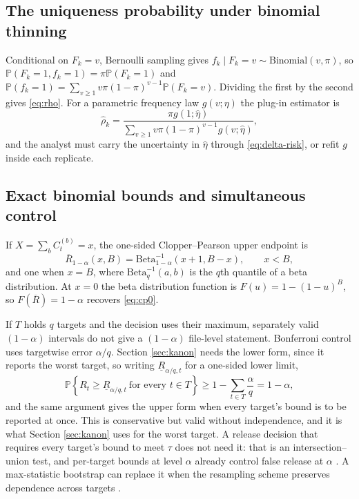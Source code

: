 \documentclass[11pt,a4paper]{article}
\theoremstyle{plain}
\theoremstyle{definition}
\theoremstyle{definition}
\theoremstyle{plain}
\newcommand{\Prob}{\mathbb{P}}
\begin{document}
\subsection{The uniqueness probability under binomial thinning}

Conditional on $F_k=v$, Bernoulli sampling gives $f_k\mid F_k=v\sim
\mathrm{Binomial}(v,\pi)$, so $\Prob(F_k=1,f_k=1)=\pi\Prob(F_k=1)$ and
$\Prob(f_k=1)=\sum_{v\ge1}v\pi(1-\pi)^{v-1}\Prob(F_k=v)$. Dividing the first by
the second gives \eqref{eq:rho}. For a parametric frequency law $g(v;\eta)$ the
plug-in estimator is
\begin{equation}
\widehat\rho_k=
\frac{\pi g(1;\widehat\eta)}
 {\sum_{v\ge1}v\pi(1-\pi)^{v-1}g(v;\widehat\eta)} ,
\end{equation}
and the analyst must carry the uncertainty in $\widehat\eta$ through
\eqref{eq:delta-risk}, or refit $g$ inside each replicate.

\subsection{Exact binomial bounds and simultaneous control}

If $X=\sum_b C_t^{(b)}=x$, the one-sided Clopper--Pearson upper endpoint is
\begin{equation}
\overline{R}_{1-\alpha}(x,B)=
\mathrm{Beta}^{-1}_{1-\alpha}(x+1,B-x),\qquad x<B,
\label{eq:cp-general}
\end{equation}
and one when $x=B$, where $\mathrm{Beta}^{-1}_q(a,b)$ is the $q$th quantile of a
beta distribution. At $x=0$ the beta distribution function is $F(u)=1-(1-u)^B$,
so $F(\overline{R})=1-\alpha$ recovers \eqref{eq:cp0}.

If $T$ holds $q$ targets and the decision uses their maximum, separately valid
$(1-\alpha)$ intervals do not give a $(1-\alpha)$ file-level statement. Bonferroni control uses targetwise error $\alpha/q$. Section \ref{sec:kanon} needs
the lower form, since it reports the worst target, so writing
$\underline{R}_{\alpha/q,t}$ for a one-sided lower limit,
\begin{equation}
\Prob\left\{R_t\ge \underline{R}_{\alpha/q,t}\ \text{for every }t\in T\right\}
\ge 1-\sum_{t\in T}\frac{\alpha}{q}=1-\alpha ,
\label{eq:bonf}
\end{equation}
and the same argument gives the upper form when every target's bound is to be
reported at once. This is conservative but valid without independence, and it is
what Section \ref{sec:kanon} uses for the worst target. A release decision that
requires every target's bound to meet $\tau$ does not need it: that is an
intersection--union test, and per-target bounds at level $\alpha$ already
control false release at $\alpha$ \citep{berger1982}. A max-statistic bootstrap can replace
it when the resampling scheme preserves dependence across targets
\citep{efron1993}.
\end{document}

